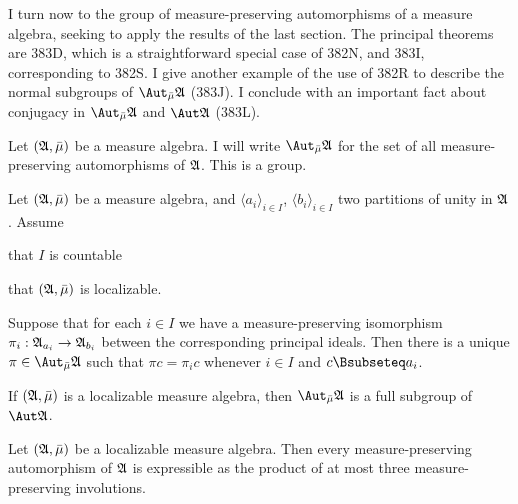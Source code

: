 
\def\cycleii#1#2#3{\cycle{#1\,_{#2}\,#3}}
\def\magnitude{\mathop{\text{mag}}}

\def\chaptername{Automorphisms}
\def\sectionname{Automorphism groups of measure algebras}


I turn now to the group of measure-preserving automorphisms of a measure
algebra, seeking to apply the results of the last section.   The
principal theorems are 383D, which is a straightforward special case of
382N, and 383I, corresponding to 382S.   I give another example of
the use of 382R to describe the normal subgroups of $\AmuA$
(383J).   I conclude with an important fact about conjugacy in $\AmuA$
and $\Aut\frak A$ (383L).

 Let $(\frak A,\bar\mu)$ be a measure algebra.
I will write $\AmuA$ for the set of all measure-preserving automorphisms
of $\frak A$.   This is a group.

 Let $(\frak A,\bar\mu)$ be a measure algebra, and
$\langle a_i\rangle_{i\in I}$, $\langle b_i\rangle_{i\in I}$ two
partitions of unity in $\frak A$.   Assume

 that $I$ is countable

 that $(\frak A,\bar\mu)$ is localizable.

\noindent Suppose that for each $i\in I$ we have a
measure-preserving isomorphism $\pi_i:\frak A_{a_i}\to\frak A_{b_i}$
between the corresponding principal ideals.   Then there is a unique
$\pi\in\AmuA$ such that $\pi c=\pi_ic$ whenever $i\in I$ and
$c\Bsubseteq a_i$.


 If $(\frak A,\bar\mu)$ is a localizable measure
algebra, then $\AmuA$ is a full
subgroup of $\Aut\frak A$.

 Let $(\frak A,\bar\mu)$ be a localizable measure
algebra.   Then every measure-preserving automorphism of $\frak A$ is
expressible as the product of at most three measure-preserving
involutions.

